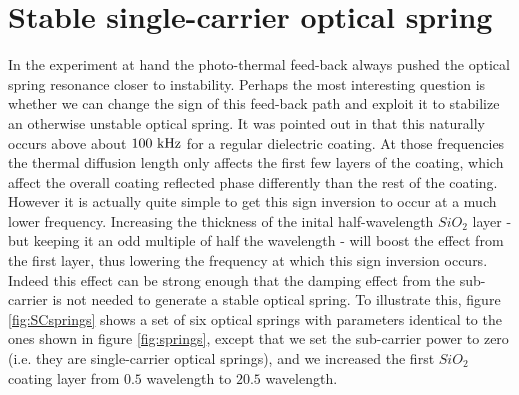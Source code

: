 \section{Stable single-carrier optical spring}
\label{sec:SCs}
In the experiment at hand the photo-thermal feed-back always pushed the optical spring resonance closer to instability.
Perhaps the most interesting question is whether we can change the sign of this feed-back path and exploit it to stabilize an otherwise unstable optical spring. It was pointed out in \cite{PhysRevD.91.023010} that this naturally occurs above about $100~{\rm kHz}$ for a regular dielectric coating. 
At those frequencies the thermal diffusion length only affects the first few layers of the coating, which affect the overall coating reflected phase differently than the rest of the coating.
However it is actually quite simple to get this sign inversion to occur at a much lower frequency. Increasing the thickness of the inital half-wavelength $SiO_2$ layer - but keeping it an odd multiple of half the wavelength - will boost the effect from the first layer, thus lowering the frequency at which this sign inversion occurs. Indeed this effect can be strong enough that the damping effect from the sub-carrier is not needed to generate a stable optical spring. To illustrate this, figure \ref{fig:SCsprings} shows a set of six optical springs with parameters identical to the ones shown in figure \ref{fig:springs}, except that we set the sub-carrier power to zero (i.e. they are single-carrier optical springs), and we increased the first $SiO_2$ coating layer from $0.5$ wavelength to $20.5$ wavelength.

